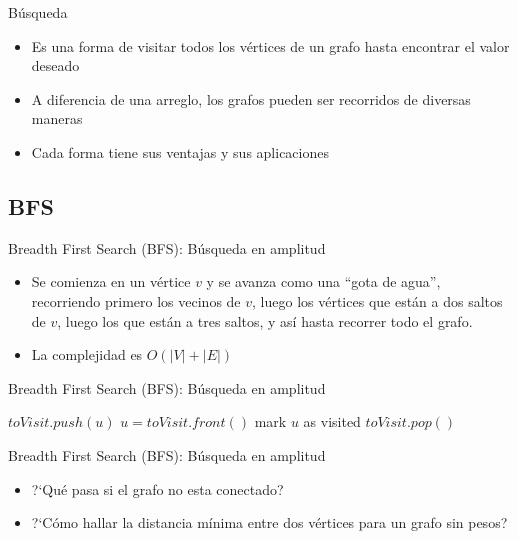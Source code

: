 \documentclass[]{beamer}
\begin{document}
\begin{frame}{B\'usqueda}
  \begin{itemize}
    \item Es una forma de visitar todos los v\'ertices de un grafo hasta encontrar el valor deseado
      \pause
    \item A diferencia de una arreglo, los grafos pueden ser recorridos de diversas maneras
      \pause
    \item Cada forma tiene sus ventajas y sus aplicaciones
  \end{itemize}
\end{frame}

\subsection{BFS}
\begin{frame}{Breadth First Search (BFS): B\'usqueda en amplitud}
  \begin{itemize}
    \item Se comienza en un v\'ertice $v$ y se avanza como una ``gota de agua'', recorriendo primero los vecinos de $v$, luego los v\'ertices que est\'an a dos saltos de $v$, luego los que est\'an a tres saltos, y as\'i hasta recorrer todo el grafo.
      \pause
    \item La complejidad es $O(|V| + |E|)$
  \end{itemize}
\end{frame}

\begin{frame}{Breadth First Search (BFS): B\'usqueda en amplitud}
  \begin{algorithm}[H]
    {$ toVisit.push(u) $} 
    {
      $u = toVisit.front() $
      {
        {
        }
      }
      { mark $u$ as visited } \;
      { $toVisit.pop()$ }
    }
  \end{algorithm}
\end{frame}

\begin{frame}{Breadth First Search (BFS): B\'usqueda en amplitud}
  \begin{itemize}
    \item ?`Qu\'e pasa si el grafo no esta conectado?
      \pause
    \item ?`C\'omo hallar la distancia m\'inima entre dos v\'ertices para un grafo sin pesos?
  \end{itemize}
\end{frame}
\end{document}
